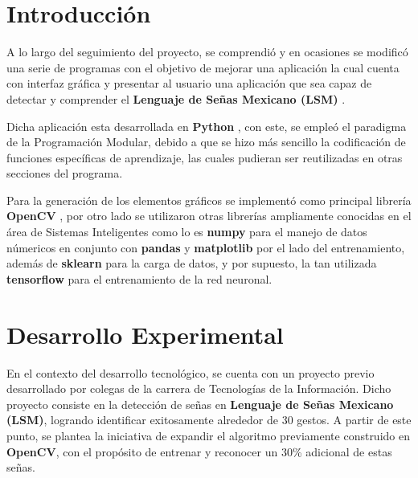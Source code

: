 \documentclass[conference]{IEEEtran}
\begin{document}




\section{Introducción}

A lo largo del seguimiento del proyecto, se comprendió y en ocasiones se modificó una serie de programas con el objetivo de mejorar una aplicación la cual cuenta con interfaz gráfica y presentar al usuario una aplicación que sea capaz de detectar y comprender el \textbf{Lenguaje de Señas Mexicano (LSM)} \cite{simonyan2014very}.

Dicha aplicación esta desarrollada en \textbf{Python} \cite{goodfellow2016deep} \cite{he2016deep}, con este, se empleó el paradigma de la Programación Modular, debido a que se hizo más sencillo la codificación de funciones específicas de aprendizaje, las cuales pudieran ser reutilizadas en otras secciones del programa.

Para la generación de los elementos gráficos se implementó como principal librería \textbf{OpenCV} \cite{opencv_library} \cite{wu2018group}, por otro lado se utilizaron otras librerías ampliamente conocidas en el área de Sistemas Inteligentes como lo es \textbf{numpy} \cite{lecun2015deep} para el manejo de datos númericos en conjunto con \textbf{pandas} \cite{szegedy2015going} y \textbf{matplotlib} \cite{kingma2014adam} por el lado del entrenamiento, además de \textbf{sklearn} \cite{liu2016ssd} para la carga de datos, y por supuesto, la tan utilizada \textbf{tensorflow} \cite{abadi2016tensorflow} para el entrenamiento de la red neuronal.




\section{Desarrollo Experimental}

En el contexto del desarrollo tecnológico, se cuenta con un proyecto previo desarrollado por colegas de la carrera de Tecnologías de la Información. Dicho proyecto consiste en la detección de señas en \textbf{Lenguaje de Señas Mexicano (LSM)}, logrando identificar exitosamente alrededor de 30 gestos. A partir de este punto, se plantea la iniciativa de expandir el algoritmo previamente construido en \textbf{OpenCV}, con el propósito de entrenar y reconocer un 30\% adicional de estas señas.
\end{document}
